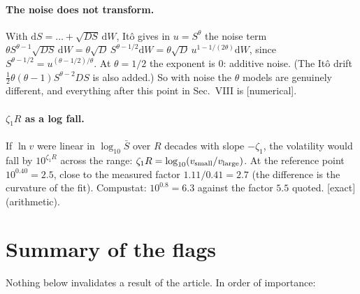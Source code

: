 \documentclass[11pt]{article}
\newcommand{\Sb}{\bar S}
\newcommand{\dd}{\mathrm d}
\newcommand{\exact}{\textsf{\small[exact]}}
\newcommand{\numer}{\textsf{\small[numerical]}}
\begin{document}
\paragraph{The noise does not transform.}  With $\dd S=\dots+\sqrt{DS}\,\dd W$, It\^o gives in $u=S^\theta$ the noise term
$\theta S^{\theta-1}\sqrt{DS}\,\dd W=\theta\sqrt D\,S^{\theta-1/2}\dd W=\theta\sqrt D\,u^{1-1/(2\theta)}\dd W$, since $S^{\theta-1/2}=u^{(\theta-1/2)/\theta}$.
At $\theta=1/2$ the exponent is $0$: additive noise.  (The It\^o drift $\tfrac12\theta(\theta-1)S^{\theta-2}DS$ is also added.)  So with
noise the $\theta$ models are genuinely different, and everything after this point in Sec.~VIII is \numer.

\paragraph{$\zeta_1R$ as a log fall.}  If $\ln v$ were linear in $\log_{10}\Sb$ over $R$ decades with slope $-\zeta_1$, the volatility
would fall by $10^{\zeta_1R}$ across the range: $\zeta_1R=\log_{10}(v_{\rm small}/v_{\rm large})$.  At the reference point
$10^{0.40}=2.5$, close to the measured factor $1.11/0.41=2.7$ (the difference is the curvature of the fit).  Compustat:
$10^{0.8}=6.3$ against the factor $5.5$ quoted.  \exact{} (arithmetic).

\section{Summary of the flags}
\label{sec:flags}

Nothing below invalidates a result of the article.  In order of importance:
\end{document}
